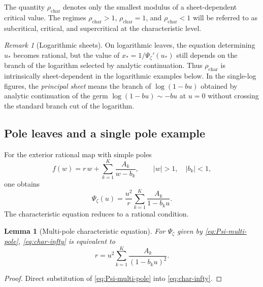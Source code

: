 \documentclass[11pt]{amsart}
\numberwithin{equation}{section}
\theoremstyle{plain}
\newtheorem{lemma}[theorem]{Lemma}
\theoremstyle{definition}
\theoremstyle{remark}
\newtheorem{remark}[theorem]{Remark}
\begin{document}
The quantity \(\rho_{\mathrm{char}}\) denotes only the smallest modulus of a
sheet-dependent critical value. The regimes
\(\rho_{\mathrm{char}}>1\), \(\rho_{\mathrm{char}}=1\), and
\(\rho_{\mathrm{char}}<1\) will be referred to as subcritical, critical, and
supercritical at the characteristic level.

\begin{remark}[Logarithmic sheets]\label{rem:log-sheet}
On logarithmic leaves, the equation determining \(u_*\) becomes rational, but the value
of \(x_*=1/\Psi_\zeta'(u_*)\) still depends on the branch of the logarithm selected by
analytic continuation. Thus \(\rho_{\mathrm{char}}\) is intrinsically
sheet-dependent in the logarithmic examples below. In the single-log figures, the
\emph{principal sheet} means the branch of \(\log(1-bu)\) obtained by analytic
continuation of the germ \(\log(1-bu)\sim -bu\) at \(u=0\) without crossing the
standard branch cut of the logarithm.
\end{remark}

\subsection{Pole leaves and a single pole example}

For the exterior rational map with simple poles
\begin{equation}\label{eq:multi-pole-map}
f(w)=r\,w+\sum_{k=1}^K \frac{A_k}{w-b_k},
\qquad |w|>1,\quad |b_k|<1,
\end{equation}
one obtains
\begin{equation}\label{eq:Psi-multi-pole}
\Psi_\zeta(u)=\frac{u^2}{r}\sum_{k=1}^K \frac{A_k}{1-b_k u}.
\end{equation}
The characteristic equation reduces to a rational condition.

\begin{lemma}[Multi-pole characteristic equation]\label{lem:char-multi-pole}
For \(\Psi_\zeta\) given by \eqref{eq:Psi-multi-pole}, \eqref{eq:char-infty} is equivalent to
\begin{equation}\label{eq:char-multi-pole-simplified}
r=u^2\sum_{k=1}^K \frac{A_k}{(1-b_k u)^2}.
\end{equation}
\end{lemma}

\begin{proof}
Direct substitution of \eqref{eq:Psi-multi-pole} into \eqref{eq:char-infty}.
\end{proof}
\end{document}

